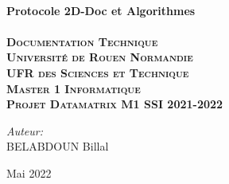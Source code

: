 \begin{titlepage}

\center %



\HRule \\[0.4cm]
{ \huge \bfseries Protocole 2D-Doc et Algorithmes}\\[0.4cm] %
\HRule \\[1.5cm]

\textsc{\huge \textbf{Documentation Technique}}\\[1.5cm]

\textsc{\Large \textbf{Université de Rouen Normandie \\[0.07cm] UFR des Sciences et Technique \\[1,5cm] Master 1 Informatique\\[0.5cm] Projet Datamatrix M1 SSI 2021-2022}}



\vspace{3cm}

\begin{center} \large
\Large \emph{Auteur:}\\[0.1cm]
\large BELABDOUN Billal\\
\end{center}
\vspace{1cm}


{\large Mai 2022}\\[1cm]

\vfill %

\end{titlepage}